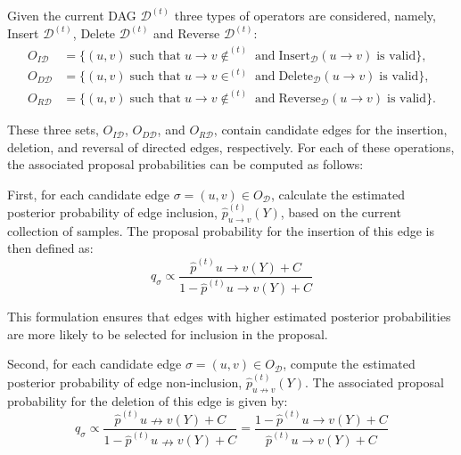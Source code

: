 \documentclass{report}
\begin{document}
Given the current DAG $\mathcal{D}^{(t)}$ three types of operators are considered, namely, Insert $\mathcal{D}^{(t)}$, Delete $\mathcal{D}^{(t)}$ and Reverse $\mathcal{D}^{(t)}$:
\begin{equation}
	\begin{split}
		O_{I\mathcal{D}} &= \{ (u,v) \; \text{such that} \; u \rightarrow v \notin ^{(t)} \; \text{and} \; \text{Insert}_{\mathcal{D}}(u \rightarrow v) \; \text{is valid} \}, \\
		O_{D\mathcal{D}} &= \{ (u,v) \; \text{such that} \; u \rightarrow v \in ^{(t)} \; \text{and} \; \text{Delete}_{\mathcal{D}}(u \rightarrow v) \; \text{is valid} \}, \\
		O_{R\mathcal{D}} &= \{ (u,v) \; \text{such that} \; u \rightarrow v \notin ^{(t)} \; \text{and} \; \text{Reverse}_{\mathcal{D}}(u \rightarrow v) \; \text{is valid} \}.
	\end{split}
\end{equation}

These three sets, $O_{I\mathcal{D}}$, $O_{D\mathcal{D}}$, and $O_{R\mathcal{D}}$, contain candidate edges for the insertion, deletion, and reversal of directed edges, respectively. For each of these operations, the associated proposal probabilities can be computed as follows:

First, for each candidate edge $\sigma = (u, v) \in O_{\mathcal{D}}$, calculate the estimated posterior probability of edge inclusion, $\hat{p}^{(t)}_{u \rightarrow v}(Y)$, based on the current collection of samples. The proposal probability for the insertion of this edge is then defined as:
\begin{equation} \label{proposal-prob-add} q_{\sigma} \propto \frac{\hat{p}^{(t)}{u \rightarrow v}(Y) + C}{1 - \hat{p}^{(t)}{u \rightarrow v}(Y) + C} \end{equation}

This formulation ensures that edges with higher estimated posterior probabilities are more likely to be selected for inclusion in the proposal.

Second, for each candidate edge $\sigma = (u, v) \in O_{\mathcal{D}}$, compute the estimated posterior probability of edge non-inclusion, $\hat{p}^{(t)}_{u \nrightarrow v}(Y)$. The associated proposal probability for the deletion of this edge is given by:
\begin{equation} \label{proposal-prob-del} q_{\sigma} \propto \frac{\hat{p}^{(t)}{u \nrightarrow v}(Y) + C}{1 - \hat{p}^{(t)}{u \nrightarrow v}(Y) + C} = \frac{1 - \hat{p}^{(t)}{u \rightarrow v}(Y) + C}{\hat{p}^{(t)}{u \rightarrow v}(Y) + C} \end{equation}
\end{document}
